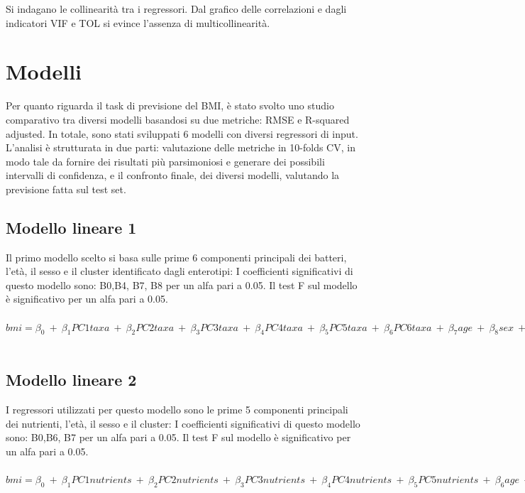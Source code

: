 Si indagano le collinearità tra i regressori. Dal grafico delle correlazioni e dagli indicatori VIF e TOL si evince l'assenza di multicollinearità.


\section{Modelli}
 Per quanto riguarda il task di previsione del BMI, è stato svolto uno studio comparativo tra diversi modelli basandosi su due metriche: RMSE e R-squared adjusted. In totale, sono stati sviluppati 6 modelli con diversi regressori di input. L’analisi è strutturata in due parti: valutazione delle metriche in 10-folds CV, in modo tale da fornire dei risultati più parsimoniosi e generare dei possibili intervalli di confidenza, e il confronto finale, dei diversi modelli, valutando la previsione fatta sul test set. 
\subsection{Modello lineare 1} 
Il primo modello scelto si basa sulle prime 6 componenti principali dei batteri, l’età, il sesso e il cluster identificato dagli enterotipi: 
I coefficienti significativi di questo modello sono: B0,B4, B7, B8 per un alfa pari a 0.05. Il test F sul modello è significativo per un alfa pari a 0.05. 
\\
\\
$bmi = \beta_0 \:+\: \beta_1 PC1taxa\: +\: \beta_2 PC2taxa \:+\: \beta_3 PC3taxa\: +\: \beta_4 PC4taxa \: +\: \beta_5 PC5taxa \:+\: \beta_6 PC6taxa\: +\: \beta_7 age\: +\: \beta_8 sex \:+\: \beta_9 cluster\: +\: \epsilon$
\\
\\

\subsection{Modello lineare 2}
I regressori utilizzati per questo modello sono le prime 5 componenti principali dei nutrienti, l’età, il sesso e il cluster: 
I coefficienti significativi di questo modello sono: B0,B6, B7 per un alfa pari a 0.05. Il test F sul modello è significativo per un alfa pari a 0.05. 
\\
\\
$bmi = \beta_0 \:+\: \beta_1 PC1nutrients\: +\: \beta_2 PC2nutrients \:+\: \beta_3 PC3nutrients\: +\: \beta_4 PC4nutrients \: +\: \beta_5 PC5nutrients \: +\: \beta_6 age\: +\: \beta_7 sex \:+\: \beta_8 cluster\: +\: \epsilon$
\\
\\

